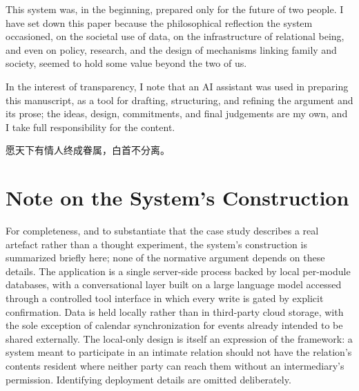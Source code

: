 \documentclass[11pt,a4paper]{article}
\begin{document}
This system was, in the beginning, prepared only for the future of two people. I have set down this paper because the philosophical reflection the system occasioned, on the societal use of data, on the infrastructure of relational being, and even on policy, research, and the design of mechanisms linking family and society, seemed to hold some value beyond the two of us. 

In the interest of transparency, I note that an AI assistant was used in preparing this manuscript, as a tool for drafting, structuring, and refining the argument and its prose; the ideas, design, commitments, and final judgements are my own, and I take full responsibility for the content.

\begin{center}
{\cjkfont\color{rosedeep} 愿天下有情人终成眷属，白首不分离。}
\end{center}

\appendix
\section{Note on the System's Construction}\label{p01:sec:appendix-technical}

For completeness, and to substantiate that the case study describes a real artefact rather than a thought experiment, the system's construction is summarized briefly here; none of the normative argument depends on these details. The application is a single server-side process backed by local per-module databases, with a conversational layer built on a large language model accessed through a controlled tool interface in which every write is gated by explicit confirmation. Data is held locally rather than in third-party cloud storage, with the sole exception of calendar synchronization for events already intended to be shared externally. The local-only design is itself an expression of the framework: a system meant to participate in an intimate relation should not have the relation's contents resident where neither party can reach them without an intermediary's permission. Identifying deployment details are omitted deliberately.
\printbibliography
\end{document}
